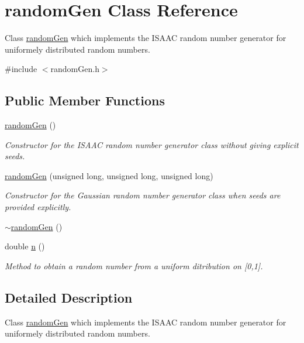 \hypertarget{classrandomGen}{\section{random\+Gen Class Reference}
\label{classrandomGen}
}


Class \hyperlink{classrandomGen}{random\+Gen} which implements the I\+S\+A\+A\+C random number generator for uniformely distributed random numbers.  




{\ttfamily \#include $<$random\+Gen.\+h$>$}

\subsection*{Public Member Functions}
\begin{DoxyCompactItemize}
\item 
\hyperlink{classrandomGen_ada03051a500718832b829f7d6f699028}{random\+Gen} ()
\begin{DoxyCompactList}\small\item\em Constructor for the I\+S\+A\+A\+C random number generator class without giving explicit seeds. \end{DoxyCompactList}\item 
\hyperlink{classrandomGen_aaec36a636be1fbdffed0c6775566e739}{random\+Gen} (unsigned long, unsigned long, unsigned long)
\begin{DoxyCompactList}\small\item\em Constructor for the Gaussian random number generator class when seeds are provided explicitly. \end{DoxyCompactList}\item 
\hyperlink{classrandomGen_aff27fbad3b28842484acd1422c41ca66}{$\sim$random\+Gen} ()
\item 
double \hyperlink{classrandomGen_a38b3e42d3a1b00f069a88f0dcceed43d}{n} ()
\begin{DoxyCompactList}\small\item\em Method to obtain a random number from a uniform ditribution on \mbox{[}0,1\mbox{]}. \end{DoxyCompactList}\end{DoxyCompactItemize}


\subsection{Detailed Description}
Class \hyperlink{classrandomGen}{random\+Gen} which implements the I\+S\+A\+A\+C random number generator for uniformely distributed random numbers. 

